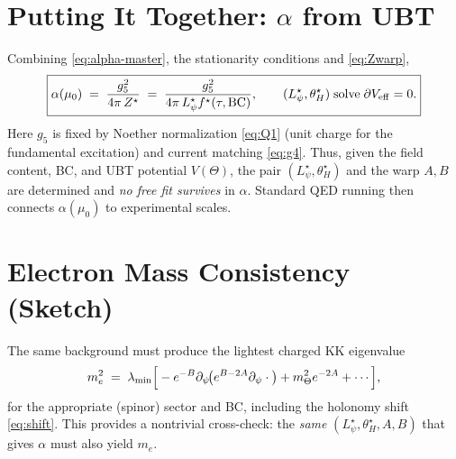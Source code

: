 \documentclass[12pt]{article}
\begin{document}
\section{Putting It Together: $\alpha$ from UBT}
Combining \eqref{eq:alpha-master}, the stationarity conditions and \eqref{eq:Zwarp},
\begin{equation}
\boxed{
\alpha(\mu_0) \;=\; \frac{g_5^2}{4\pi \, Z^\star}
\;=\; \frac{g_5^2}{4\pi \, L_\psi^\star f^\star(\tau,\mathrm{BC})},
\qquad
(L_\psi^\star,\theta_H^\star)\; \text{solve}\; \partial V_{\rm eff}=0.}
\end{equation}
Here $g_5$ is fixed by Noether normalization \eqref{eq:Q1} (unit charge for the fundamental excitation) and current matching \eqref{eq:g4}.
Thus, given the field content, BC, and UBT potential $V(\Theta)$, the pair $(L_\psi^\star,\theta_H^\star)$ and the warp $A,B$ are determined
and \emph{no free fit survives} in $\alpha$. Standard QED running then connects $\alpha(\mu_0)$ to experimental scales.

\section{Electron Mass Consistency (Sketch)}
The same background must produce the lightest charged KK eigenvalue
\begin{equation}
m_e^2 \;=\; \lambda_{\rm min}\Big[ -e^{-B}\partial_\psi\!\big( e^{B-2A}\partial_\psi \cdot \big) + m_\Theta^2 e^{-2A} + \cdots \Big],
\end{equation}
for the appropriate (spinor) sector and BC, including the holonomy shift \eqref{eq:shift}.
This provides a nontrivial cross-check: the \emph{same} $(L_\psi^\star,\theta_H^\star, A,B)$ that gives $\alpha$ must also yield $m_e$.

\appendix
\end{document}
